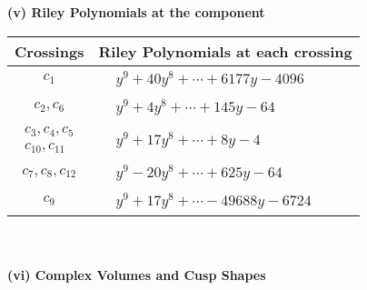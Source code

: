 \documentclass[1p]{elsarticle_modified}
\theoremstyle{definition}
\begin{document}
\flushleft \textbf{(v) Riley Polynomials at the component}\newline \\
\begin{tabular}{m{50pt}|m{274pt}}
Crossings & \hspace{64pt}Riley Polynomials at each crossing \\
\hline $$\begin{aligned}c_{1}\end{aligned}$$&$\begin{aligned}
&y^9+40 y^8+\cdots+6177 y-4096
\end{aligned}$\\
\hline $$\begin{aligned}c_{2},c_{6}\end{aligned}$$&$\begin{aligned}
&y^9+4 y^8+\cdots+145 y-64
\end{aligned}$\\
\hline $$\begin{aligned}c_{3},c_{4},c_{5}\\c_{10},c_{11}\end{aligned}$$&$\begin{aligned}
&y^9+17 y^8+\cdots+8 y-4
\end{aligned}$\\
\hline $$\begin{aligned}c_{7},c_{8},c_{12}\end{aligned}$$&$\begin{aligned}
&y^9-20 y^8+\cdots+625 y-64
\end{aligned}$\\
\hline $$\begin{aligned}c_{9}\end{aligned}$$&$\begin{aligned}
&y^9+17 y^8+\cdots-49688 y-6724
\end{aligned}$\\
\hline
\end{tabular}\\~\\
\newpage\flushleft \textbf{(vi) Complex Volumes and Cusp Shapes}
\end{document}
